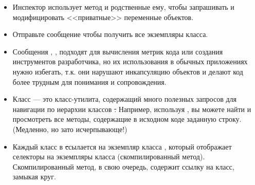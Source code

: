 \documentclass[a4paper,10pt,twoside]{book}
\begin{document}
{\begin{itemize}
\item Инспектор использует метод  и родственные ему, чтобы запрашивать и модифицировать <<приватные>> переменные объектов.
\item Отправьте сообщение  чтобы получить все экземпляры класса.
\item Сообщения , ,  \etc подходят для вычисления метрик кода или создания инструментов разработчика, но их использования в обычных приложениях нужно избегать, т.к. они нарушают инкапсуляцию объектов и делают код более трудным для понимания и сопровождения.
\item Класс  --- это класс-утилита, содержащий много полезных запросов для навигации по иерархии классов \st. Например, используя , вы можете найти и просмотреть все методы, содержащие в исходном коде заданную строку. (Медленно, но зато исчерпывающе!)
\item Каждый класс в \st ссылается на экземпляр класса , который отображает селекторы на экземпляры класса  (скомпилированный метод). Скомпилированный метод, в свою очередь, содержит ссылку на класс, замыкая круг. 

\end{itemize}}
\end{document}
